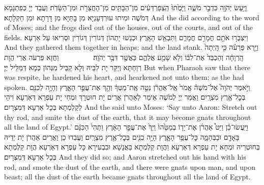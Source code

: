 {וַיַּ֥עַשׂ יְהֹוָ֖ה כִּדְבַ֣ר מֹשֶׁ֑ה וַיָּמֻ֙תוּ֙ הַֽצְפַרְדְּעִ֔ים מִן־הַבָּתִּ֥ים מִן־הַחֲצֵרֹ֖ת וּמִן־הַשָּׂדֹֽת׃}
{וַעֲבַד יְיָ כְּפִתְגָמָא דְּמֹשֶׁה וּמִיתוּ עוּרְדְּעָנַיָּא מִן בָּתַּיָּא מִן דָּרָתָא וּמִן חַקְלָתָא׃}
{And the \lord\space did according to the word of Moses; and the frogs died out of the houses, out of the courts, and out of the fields.}{}
{וַיִּצְבְּר֥וּ אֹתָ֖ם חֳמָרִ֣ם חֳמָרִ֑ם וַתִּבְאַ֖שׁ הָאָֽרֶץ׃
}
{וּכְנַשׁוּ יָתְהוֹן דְּגוֹרִין דְּגוֹרִין וּסְרִיאוּ עַל אַרְעָא׃}
{And they gathered them together in heaps; and the land stank.}{}
{וַיַּ֣רְא פַּרְעֹ֗ה כִּ֤י הָֽיְתָה֙ הָֽרְוָחָ֔ה וְהַכְבֵּד֙ אֶת־לִבּ֔וֹ וְלֹ֥א שָׁמַ֖ע אֲלֵהֶ֑ם כַּאֲשֶׁ֖ר דִּבֶּ֥ר יְהֹוָֽה׃ \setuma         
}
{וַחֲזָא פַּרְעֹה אֲרֵי הֲוָת רְוַחְתָּא וְיַקַּר יָת לִבֵּיהּ וְלָא קַבֵּיל מִנְּהוֹן כְּמָא דְּמַלֵּיל יְיָ׃}
{But when Pharaoh saw that there was respite, he hardened his heart, and hearkened not unto them; as the \lord\space had spoken.}{}
{וַיֹּ֣אמֶר יְהֹוָה֮ אֶל־מֹשֶׁה֒ אֱמֹר֙ אֶֽל־אַהֲרֹ֔ן נְטֵ֣ה אֶֽת־מַטְּךָ֔ וְהַ֖ךְ אֶת־עֲפַ֣ר הָאָ֑רֶץ וְהָיָ֥ה לְכִנִּ֖ם בְּכׇל־אֶ֥רֶץ מִצְרָֽיִם׃
}
{וַאֲמַר יְיָ לְמֹשֶׁה אֵימַר לְאַהֲרֹן אֲרֵים יָת חוּטְרָךְ וּמְחִי יָת עַפְרָא דְּאַרְעָא וִיהֵי לְקַלְמְתָא בְּכָל אַרְעָא דְּמִצְרָיִם׃}
{And the \lord\space said unto Moses: ‘Say unto Aaron: Stretch out thy rod, and smite the dust of the earth, that it may become gnats throughout all the land of Egypt.’}{}
{וַיַּֽעֲשׂוּ־כֵ֗ן וַיֵּט֩ אַהֲרֹ֨ן אֶת־יָד֤וֹ בְמַטֵּ֙הוּ֙ וַיַּךְ֙ אֶת־עֲפַ֣ר הָאָ֔רֶץ וַתְּהִי֙ הַכִּנָּ֔ם בָּאָדָ֖ם וּבַבְּהֵמָ֑ה כׇּל־עֲפַ֥ר הָאָ֛רֶץ הָיָ֥ה כִנִּ֖ים בְּכׇל־אֶ֥רֶץ מִצְרָֽיִם׃
}
{וַעֲבַדוּ כֵן וַאֲרֵים אַהֲרֹן יָת יְדֵיהּ בְּחוּטְרֵיהּ וּמְחָא יָת עַפְרָא דְּאַרְעָא וַהֲוָת קַלְמְתָא בַּאֲנָשָׁא וּבִבְעִירָא כָּל עַפְרָא דְּאַרְעָא הֲוָת קַלְמְתָא בְּכָל אַרְעָא דְּמִצְרָיִם׃}
{And they did so; and Aaron stretched out his hand with his rod, and smote the dust of the earth, and there were gnats upon man, and upon beast; all the dust of the earth became gnats throughout all the land of Egypt.}{}
